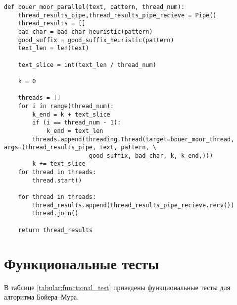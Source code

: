 \newpage
\begin{lstlisting}[label=lst:thread2,caption= Cхема главного потока (диспетчера) алгоритма Бойера--Мура]
def bouer_moor_parallel(text, pattern, thread_num):
	thread_results_pipe,thread_results_pipe_recieve = Pipe()
	thread_results = []
	bad_char = bad_char_heuristic(pattern)
	good_suffix = good_suffix_heuristic(pattern)
	text_len = len(text)
	
	text_slice = int(text_len / thread_num)
	
	k = 0
	
	threads = []
	for i in range(thread_num):
		k_end = k + text_slice
		if (i == thread_num - 1):
			k_end = text_len
		threads.append(threading.Thread(target=bouer_moor_thread, args=(thread_results_pipe, text, pattern, \
						good_suffix, bad_char, k, k_end,)))
		k += text_slice
	for thread in threads:
		thread.start()
	
	for thread in threads:
		thread_results.append(thread_results_pipe_recieve.recv())
		thread.join()
	
	return thread_results
\end{lstlisting}
\section{Функциональные тесты}
В таблице \ref{tabular:functional_test} приведены функциональные тесты для алгоритма Бойера--Мура.

